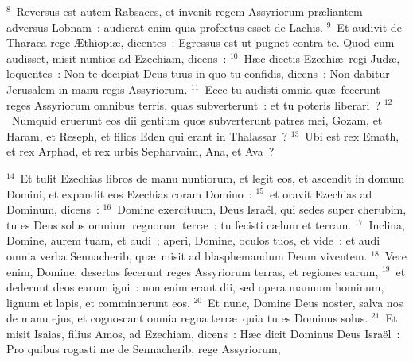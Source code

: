 ${}^{8}$~Reversus est autem Rabsaces, et invenit regem Assyriorum pr\ae liantem adversus Lobnam~: audierat enim quia profectus esset de Lachis.
${}^{9}$~Et audivit de Tharaca rege \AE thiopi\ae , dicentes~: Egressus est ut pugnet contra te. Quod cum audisset, misit nuntios ad Ezechiam, dicens~:
${}^{10}$~H\ae c dicetis Ezechi\ae\ regi Jud\ae , loquentes~: Non te decipiat Deus tuus in quo tu confidis, dicens~: Non dabitur Jerusalem in manu regis Assyriorum.
${}^{11}$~Ecce tu audisti omnia qu\ae\ fecerunt reges Assyriorum omnibus terris, quas subverterunt~: et tu poteris liberari~?
${}^{12}$~Numquid eruerunt eos dii gentium quos subverterunt patres mei, Gozam, et Haram, et Reseph, et filios Eden qui erant in Thalassar~?
${}^{13}$~Ubi est rex Emath, et rex Arphad, et rex urbis Sepharvaim, Ana, et Ava~?


${}^{14}$~Et tulit Ezechias libros de manu nuntiorum, et legit eos, et ascendit in domum Domini, et expandit eos Ezechias coram Domino~:
${}^{15}$~et oravit Ezechias ad Dominum, dicens~:
${}^{16}$~Domine exercituum, Deus Isra\"el, qui sedes super cherubim, tu es Deus solus omnium regnorum terr\ae~: tu fecisti c\ae lum et terram.
${}^{17}$~Inclina, Domine, aurem tuam, et audi~; aperi, Domine, oculos tuos, et vide~: et audi omnia verba Sennacherib, qu\ae\ misit ad blasphemandum Deum viventem.
${}^{18}$~Vere enim, Domine, desertas fecerunt reges Assyriorum terras, et regiones earum,
${}^{19}$~et dederunt deos earum igni~: non enim erant dii, sed opera manuum hominum, lignum et lapis, et comminuerunt eos.
${}^{20}$~Et nunc, Domine Deus noster, salva nos de manu ejus, et cognoscant omnia regna terr\ae\ quia tu es Dominus solus.
${}^{21}$~Et misit Isaias, filius Amos, ad Ezechiam, dicens~: H\ae c dicit Dominus Deus Isra\"el~: Pro quibus rogasti me de Sennacherib, rege Assyriorum,
